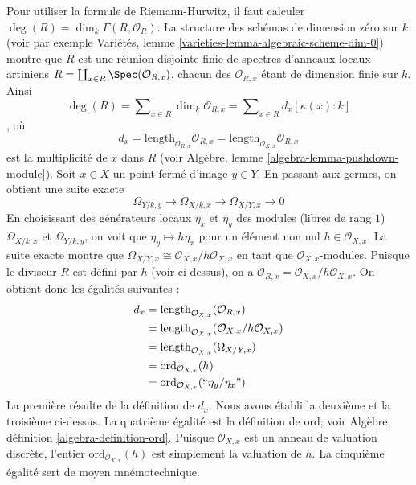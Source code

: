 \medskip\noindent
Pour utiliser la formule de Riemann-Hurwitz, il faut calculer $\deg(R) = \dim_k \Gamma(R, \mathcal{O}_R)$. La structure des schémas de dimension zéro sur $k$ (voir par exemple Variétés, lemme \ref{varieties-lemma-algebraic-scheme-dim-0}) montre que $R$ est une réunion disjointe finie de spectres d'anneaux locaux artiniens $R = \coprod_{x \in R} \Spec(\mathcal{O}_{R, x})$, chacun des $\mathcal{O}_{R, x}$ étant de dimension finie sur $k$. Ainsi
$$
\deg(R) = \sum\nolimits_{x \in R} \dim_k \mathcal{O}_{R, x} =
\sum\nolimits_{x \in R} d_x [\kappa(x) : k]
$$, où $$
d_x = \text{length}_{\mathcal{O}_{R, x}} \mathcal{O}_{R, x} =
\text{length}_{\mathcal{O}_{X, x}} \mathcal{O}_{R, x}
$$ est la multiplicité de $x$ dans $R$ (voir Algèbre, lemme \ref{algebra-lemma-pushdown-module}). Soit $x \in X$ un point fermé d'image $y \in Y$. En passant aux germes, on obtient une suite exacte $$
\Omega_{Y/k, y} \to \Omega_{X/k, x} \to \Omega_{X/Y, x} \to 0
$$ En choisissant des générateurs locaux $\eta_x$ et $\eta_y$ des modules (libres de rang $1$) $\Omega_{X/k, x}$ et $\Omega_{Y/k, y}$, on voit que $
\eta_y \mapsto h \eta_x
$ pour un élément non nul $h \in \mathcal{O}_{X, x}$. La suite exacte montre que $\Omega_{X/Y, x} \cong \mathcal{O}_{X, x}/h\mathcal{O}_{X, x}$ en tant que $\mathcal{O}_{X, x}$-modules. Puisque le diviseur $R$ est défini par $h$ (voir ci-dessus), on a $\mathcal{O}_{R, x} = \mathcal{O}_{X, x}/h\mathcal{O}_{X, x}$. On obtient donc les égalités suivantes : \begin{align*}
d_x
& =
\text{length}_{\mathcal{O}_{X, x}}(\mathcal{O}_{R, x}) \\
& =
\text{length}_{\mathcal{O}_{X, x}}(\mathcal{O}_{X, x}/h\mathcal{O}_{X, x}) \\
& =
\text{length}_{\mathcal{O}_{X, x}}(\Omega_{X/Y, x}) \\
& =
\text{ord}_{\mathcal{O}_{X, x}}(h) \\
& =
\text{ord}_{\mathcal{O}_{X, x}}(``\eta_y/\eta_x")
\end{align*} La première résulte de la définition de $d_x$. Nous avons établi la deuxième et la troisième ci-dessus. La quatrième égalité est la définition de $\text{ord}$; voir Algèbre, définition \ref{algebra-definition-ord}. Puisque $\mathcal{O}_{X, x}$ est un anneau de valuation discrète, l'entier $\text{ord}_{\mathcal{O}_{X, x}}(h)$ est simplement la valuation de $h$. La cinquième égalité sert de moyen mnémotechnique.

